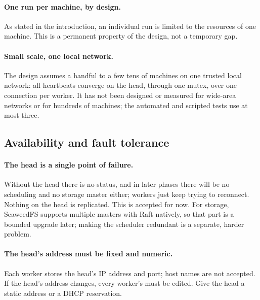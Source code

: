 \documentclass{article}
\begin{document}
\paragraph{One run per machine, by design.}
As stated in the introduction, an individual run is limited to the
resources of one machine. This is a permanent property of the design,
not a temporary gap.

\paragraph{Small scale, one local network.}
The design assumes a handful to a few tens of machines on one trusted
local network: all heartbeats converge on the head, through one mutex,
over one connection per worker. It has not been designed or measured for
wide-area networks or for hundreds of machines; the automated and
scripted tests use at most three.

\subsection{Availability and fault tolerance}
\label{sec:lim-availability}

\paragraph{The head is a single point of failure.}
Without the head there is no status, and in later phases there will be no
scheduling and no storage master either; workers just keep trying to
reconnect. Nothing on the head is replicated. This is accepted for now.
For storage, SeaweedFS supports multiple masters with Raft natively, so
that part is a bounded upgrade later; making the scheduler redundant is a
separate, harder problem.

\paragraph{The head's address must be fixed and numeric.}
Each worker stores the head's IP address and port; host names are not
accepted. If the head's address changes, every worker's
 must be edited. Give the head a static address or a
DHCP reservation.
\end{document}
